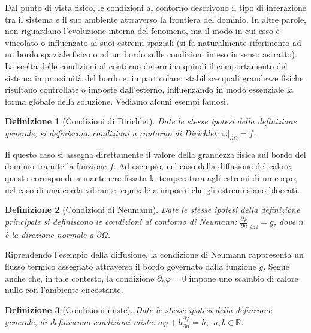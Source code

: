 \documentclass[a4paper,12pt]{report}
\newtheorem{definizione}{Definizione}[chapter]
\begin{document}
Dal punto di vista fisico, le condizioni al contorno descrivono il tipo di interazione tra il sistema e il suo ambiente attraverso la frontiera del dominio. In altre parole, non riguardano l’evoluzione interna del fenomeno, ma il modo in cui esso è vincolato o influenzato ai suoi estremi spaziali (si fa naturalmente riferimento ad un bordo spaziale fisico o ad un bordo sulle condizioni inteso in senso astratto). La scelta delle condizioni al contorno determina quindi il comportamento del sistema in prossimità del bordo e, in particolare, stabilisce quali grandezze fisiche risultano controllate o imposte dall’esterno, influenzando in modo essenziale la forma globale della soluzione. Vediamo alcuni esempi famosi.
\vspace{0.5cm}
\begin{definizione}[Condizioni di Dirichlet]\label{def: 4.5}
    Date le stesse ipotesi della definizione generale, si definiscono condizioni a contorno di Dirichlet: $\varphi|_{\partial\Omega}=f$.
\end{definizione}
\vspace{0.5cm}
Ii questo caso si assegna direttamente il valore della grandezza fisica sul bordo del dominio tramite la funzione $f$. Ad esempio, nel caso della diffusione del calore, questo corrisponde a mantenere fissata la temperatura agli estremi di un corpo; nel caso di una corda vibrante, equivale a imporre che gli estremi siano bloccati.
\vspace{0.5cm}
\begin{definizione}[Condizioni di Neumann]
    Date le stesse ipotesi della definizione principale si definiscono le condizioni al contorno di Neumann: $\displaystyle\frac{\partial\varphi}{\partial n}\bigg|_{\partial\Omega}=g$, dove $n$ è la direzione normale a $\partial\Omega$.
\end{definizione}
\vspace{0.5cm}
Riprendendo l'esempio della diffusione, la condizione di Neumann rappresenta un flusso termico assegnato attraverso il bordo governato dalla funzione $g$. Segue anche che, in tale contesto, la condizione $\partial_n\varphi=0$ impone uno scambio di calore nullo con l'ambiente circostante.
\vspace{0.5cm}
\begin{definizione}[Condizioni miste]
    Date le stesse ipotesi della definzione generale, di definiscono condizioni miste: $a\varphi+b\displaystyle\frac{\partial\varphi}{\partial n}=h; \ \ a,b\in \mathbb{R}$.
\end{definizione}
\end{document}

